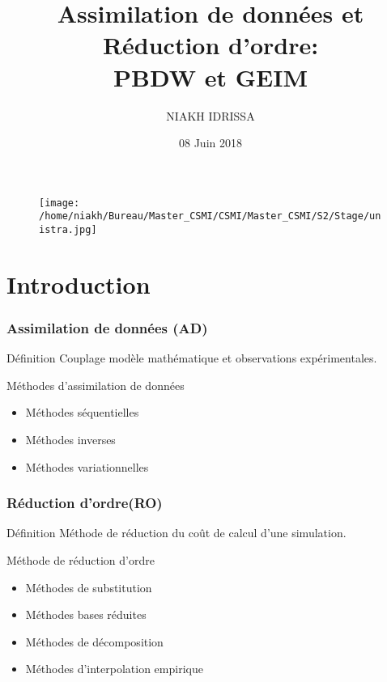 \documentclass[a4paper,10pt]{beamer}
\title[\sc Assimilation de données ]{\sc Assimilation de données et Réduction d'ordre:\\ PBDW et GEIM}
\author[\sc I.NIAKH]{\sc NIAKH IDRISSA}
\institute[\sc UNISTRA]{\sc Sous la direction de Christophe Prud'homme }
\date[08-06-18]{08 Juin 2018}
\numberwithin{equation}{section}
\begin{document}
	
\begin{frame}
\begin{figure}
    \texttt{[image: /home/niakh/Bureau/Master\_CSMI/CSMI/Master\_CSMI/S2/Stage/unistra.jpg]}
\end{figure}
\titlepage
\end{frame}

\begin{frame}
{\contentsname}
\tableofcontents
\end{frame}
\section{\sc Introduction}


\begin{frame}
\frametitle{\sc Assimilation de données (AD)}
\begin{block}{\sc Définition}
	Couplage modèle mathématique et observations expérimentales.
	\pause
\end{block}
\begin{block}{\sc Méthodes d'assimilation de données}
	\pause
	\begin{itemize}[<+->]
		\item Méthodes séquentielles
		\item Méthodes inverses
		\item Méthodes variationnelles
	\end{itemize}
\end{block}
\end{frame}


\begin{frame}
\frametitle{\sc Réduction d'ordre(RO)}
\begin{block}{\sc Définition}
	Méthode de réduction du coût de calcul d'une simulation.
	\pause
\end{block}
\begin{block}{\sc Méthode de réduction d'ordre}
	\pause
	\begin{itemize}[<+->]
		\item Méthodes de substitution
		\item Méthodes bases réduites 
		\item Méthodes de décomposition
		\item Méthodes d'interpolation empirique
	\end{itemize}
\end{block}

\end{frame}
\end{document}
